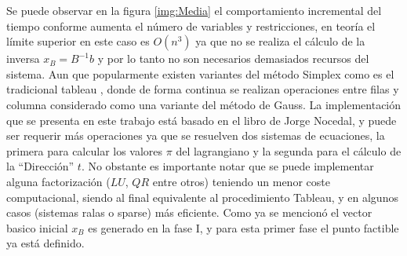 Se puede observar en la figura \ref{img:Media} el comportamiento incremental del tiempo conforme aumenta el número de variables y restricciones, en teoría el límite superior en este caso es $O(n^3)$ ya que no se realiza el cálculo de la inversa $x_B = B^{-1} b$ y por lo tanto no son necesarios demasiados recursos del sistema.
%
Aun que popularmente existen variantes del método Simplex como es el tradicional tableau \cite{bland1977new}, donde de forma continua se realizan operaciones entre filas y columna considerado como una variante del método de Gauss.
%
La implementación que se presenta en este trabajo está basado en el libro de Jorge Nocedal, y puede ser requerir más operaciones ya que se resuelven dos sistemas de ecuaciones, la primera para calcular los valores $\pi$ del lagrangiano y la segunda para el cálculo de la ``Dirección'' $t$.
%
No obstante es importante notar que se puede implementar alguna factorización ($LU$, $QR$ entre otros) teniendo un menor coste computacional, siendo al final equivalente al procedimiento Tableau, y en algunos casos (sistemas ralas o sparse) más eficiente. 
%
Como ya se mencionó el vector basico inicial $x_B$ es generado en la fase I, y para esta primer fase el punto factible ya está definido.
%


